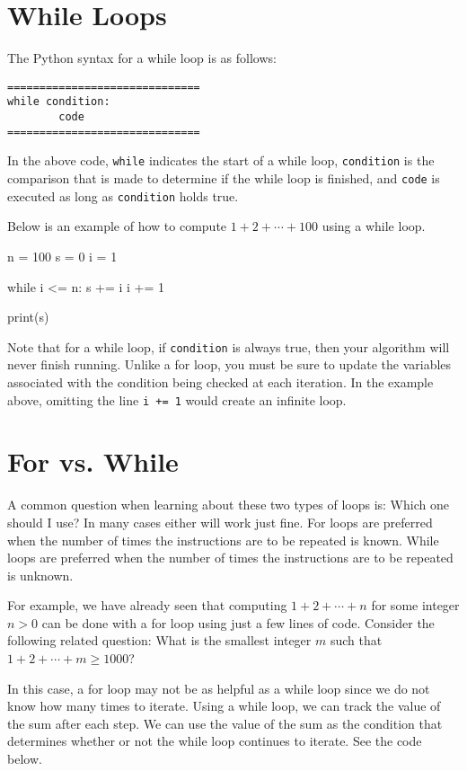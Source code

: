 \documentclass{ximera}
\begin{document}
\section{While Loops}

The Python syntax for a while loop is as follows:

\begin{verbatim}
==============================
while condition:
        code
==============================
\end{verbatim}

In the above code, \verb|while| indicates the start of a while loop, \verb|condition| is the comparison that is made to determine if the while loop is finished, and \verb|code| is executed as long as \verb|condition| holds true.

Below is an example of how to compute $1+2+\cdots+100$ using a while loop.

\begin{sageCell}
n = 100
s = 0
i = 1

while i <= n:
        s += i
        i += 1

print(s)
\end{sageCell}

Note that for a while loop, if \verb|condition| is always true, then your algorithm will never finish running. Unlike a for loop, you must be sure to update the variables associated with the condition being checked at each iteration. In the example above, omitting the line \verb|i += 1| would create an infinite loop.

\section{For vs. While}

A common question when learning about these two types of loops is: Which one should I use? In many cases either will work just fine. For loops are preferred when the number of times the instructions are to be repeated is known. While loops are preferred when the number of times the instructions are to be repeated is unknown.

For example, we have already seen that computing $1+2+\cdots+n$ for some integer $n>0$ can be done with a for loop using just a few lines of code. Consider the following related question: What is the smallest integer $m$ such that $1+2+\cdots+m\geq 1000$?

In this case, a for loop may not be as helpful as a while loop since we do not know how many times to iterate. Using a while loop, we can track the value of the sum after each step. We can use the value of the sum as the condition that determines whether or not the while loop continues to iterate. See the code below.
\end{document}
